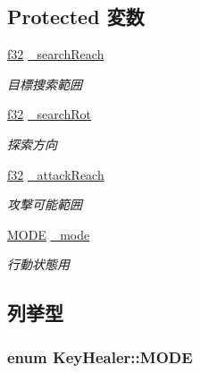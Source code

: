 \subsection*{Protected 変数}
\begin{DoxyCompactItemize}
\item 
\hyperlink{_main_8h_a5f6906312a689f27d70e9d086649d3fd}{f32} \hyperlink{class_key_healer_a3160dc53c3204308a587966fac89a0f8}{\-\_\-search\-Reach}
\begin{DoxyCompactList}\small\item\em 目標捜索範囲 \end{DoxyCompactList}\item 
\hyperlink{_main_8h_a5f6906312a689f27d70e9d086649d3fd}{f32} \hyperlink{class_key_healer_af54b304d55b65e52fb65301d4e2ea1d7}{\-\_\-search\-Rot}
\begin{DoxyCompactList}\small\item\em 探索方向 \end{DoxyCompactList}\item 
\hyperlink{_main_8h_a5f6906312a689f27d70e9d086649d3fd}{f32} \hyperlink{class_key_healer_a878378921359fc40142e3a783d8225ff}{\-\_\-attack\-Reach}
\begin{DoxyCompactList}\small\item\em 攻撃可能範囲 \end{DoxyCompactList}\item 
\hyperlink{class_key_healer_aefc9d3de1d5f7121b3584255e580c5f0}{M\-O\-D\-E} \hyperlink{class_key_healer_adc6356b370bcde5739011c381d125503}{\-\_\-mode}
\begin{DoxyCompactList}\small\item\em 行動状態用 \end{DoxyCompactList}\end{DoxyCompactItemize}


\subsection{列挙型}
\hypertarget{class_key_healer_aefc9d3de1d5f7121b3584255e580c5f0}{
\subsubsection[{M\-O\-D\-E}]{\setlength{\rightskip}{0pt plus 5cm}enum {\bf Key\-Healer\-::\-M\-O\-D\-E}}}\label{class_key_healer_aefc9d3de1d5f7121b3584255e580c5f0}


